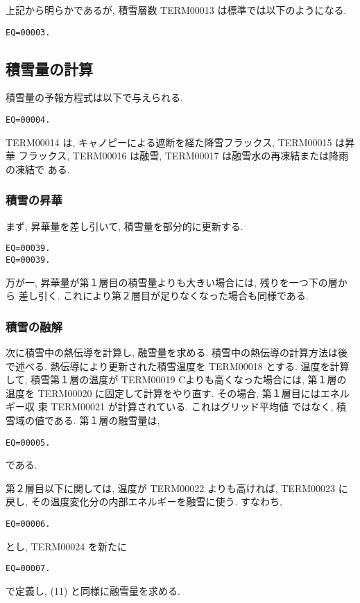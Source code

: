 上記から明らかであるが, 積雪層数 TERM00013 は標準では以下のようになる.
\begin{verbatim}
EQ=00003.
\end{verbatim}

\subsection{積雪量の計算}

積雪量の予報方程式は以下で与えられる.
\begin{verbatim}
EQ=00004.
\end{verbatim}
TERM00014 は, キャノピーによる遮断を経た降雪フラックス, TERM00015 は昇華
フラックス, TERM00016 は融雪, TERM00017 は融雪水の再凍結または降雨の凍結で
ある.

\subsubsection{積雪の昇華}

まず, 昇華量を差し引いて, 積雪量を部分的に更新する.
\begin{verbatim}
EQ=00039.
EQ=00039.
\end{verbatim}
万が一, 昇華量が第１層目の積雪量よりも大きい場合には, 残りを一つ下の層から
差し引く. これにより第２層目が足りなくなった場合も同様である.

\subsubsection{積雪の融解}

次に積雪中の熱伝導を計算し, 融雪量を求める.
積雪中の熱伝導の計算方法は後で述べる.
熱伝導により更新された積雪温度を TERM00018 とする.
温度を計算して, 積雪第１層の温度が
TERM00019 Cよりも高くなった場合には, 第１層の温度を
TERM00020 に固定して計算をやり直す. その場合, 第１層目にはエネルギー収
束 TERM00021 が計算されている. これはグリッド平均値
ではなく, 積雪域の値である.
第１層の融雪量は,
\begin{verbatim}
EQ=00005.
\end{verbatim}
である.

第２層目以下に関しては, 温度が TERM00022 よりも高ければ, TERM00023 に戻し,
その温度変化分の内部エネルギーを融雪に使う.
すなわち,
\begin{verbatim}
EQ=00006.
\end{verbatim}
とし, TERM00024 を新たに
\begin{verbatim}
EQ=00007.
\end{verbatim}
で定義し, (11) と同様に融雪量を求める.

